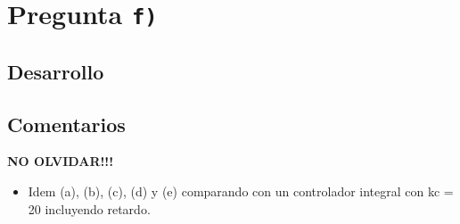 \section{Pregunta \texttt{f)}}\label{pregunta-f}


\subsection{Desarrollo}


\FloatBarrier
\subsection{Comentarios}

\textbf{NO OLVIDAR!!!}

\begin{itemize}
  \item Idem (a), (b), (c), (d) y (e) comparando con un controlador integral con kc = 20 incluyendo retardo.
\end{itemize}